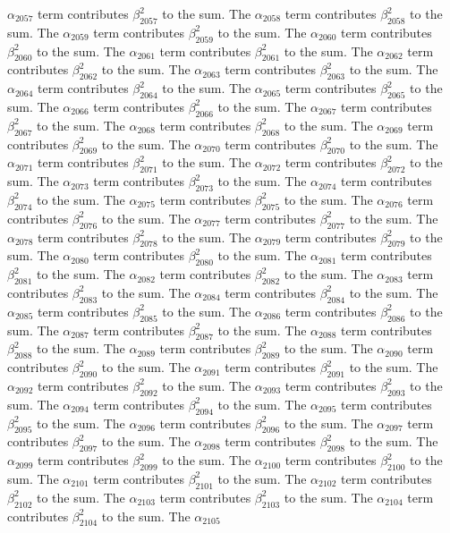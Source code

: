\begin{lemma}
$\alpha_{2057}$ term contributes $\beta_{2057}^{2}$ to the sum. The $\alpha_{2058}$ term contributes $\beta_{2058}^{2}$ to the sum. The $\alpha_{2059}$ term contributes $\beta_{2059}^{2}$ to the sum. The $\alpha_{2060}$ term contributes $\beta_{2060}^{2}$ to the sum. The $\alpha_{2061}$ term contributes $\beta_{2061}^{2}$ to the sum. The $\alpha_{2062}$ term contributes $\beta_{2062}^{2}$ to the sum. The $\alpha_{2063}$ term contributes $\beta_{2063}^{2}$ to the sum. The $\alpha_{2064}$ term contributes $\beta_{2064}^{2}$ to the sum. The $\alpha_{2065}$ term contributes $\beta_{2065}^{2}$ to the sum. The $\alpha_{2066}$ term contributes $\beta_{2066}^{2}$ to the sum. The $\alpha_{2067}$ term contributes $\beta_{2067}^{2}$ to the sum. The $\alpha_{2068}$ term contributes $\beta_{2068}^{2}$ to the sum. The $\alpha_{2069}$ term contributes $\beta_{2069}^{2}$ to the sum. The $\alpha_{2070}$ term contributes $\beta_{2070}^{2}$ to the sum. The $\alpha_{2071}$ term contributes $\beta_{2071}^{2}$ to the sum. The $\alpha_{2072}$ term contributes $\beta_{2072}^{2}$ to the sum. The $\alpha_{2073}$ term contributes $\beta_{2073}^{2}$ to the sum. The $\alpha_{2074}$ term contributes $\beta_{2074}^{2}$ to the sum. The $\alpha_{2075}$ term contributes $\beta_{2075}^{2}$ to the sum. The $\alpha_{2076}$ term contributes $\beta_{2076}^{2}$ to the sum. The $\alpha_{2077}$ term contributes $\beta_{2077}^{2}$ to the sum. The $\alpha_{2078}$ term contributes $\beta_{2078}^{2}$ to the sum. The $\alpha_{2079}$ term contributes $\beta_{2079}^{2}$ to the sum. The $\alpha_{2080}$ term contributes $\beta_{2080}^{2}$ to the sum. The $\alpha_{2081}$ term contributes $\beta_{2081}^{2}$ to the sum. The $\alpha_{2082}$ term contributes $\beta_{2082}^{2}$ to the sum. The $\alpha_{2083}$ term contributes $\beta_{2083}^{2}$ to the sum. The $\alpha_{2084}$ term contributes $\beta_{2084}^{2}$ to the sum. The $\alpha_{2085}$ term contributes $\beta_{2085}^{2}$ to the sum. The $\alpha_{2086}$ term contributes $\beta_{2086}^{2}$ to the sum. The $\alpha_{2087}$ term contributes $\beta_{2087}^{2}$ to the sum. The $\alpha_{2088}$ term contributes $\beta_{2088}^{2}$ to the sum. The $\alpha_{2089}$ term contributes $\beta_{2089}^{2}$ to the sum. The $\alpha_{2090}$ term contributes $\beta_{2090}^{2}$ to the sum. The $\alpha_{2091}$ term contributes $\beta_{2091}^{2}$ to the sum. The $\alpha_{2092}$ term contributes $\beta_{2092}^{2}$ to the sum. The $\alpha_{2093}$ term contributes $\beta_{2093}^{2}$ to the sum. The $\alpha_{2094}$ term contributes $\beta_{2094}^{2}$ to the sum. The $\alpha_{2095}$ term contributes $\beta_{2095}^{2}$ to the sum. The $\alpha_{2096}$ term contributes $\beta_{2096}^{2}$ to the sum. The $\alpha_{2097}$ term contributes $\beta_{2097}^{2}$ to the sum. The $\alpha_{2098}$ term contributes $\beta_{2098}^{2}$ to the sum. The $\alpha_{2099}$ term contributes $\beta_{2099}^{2}$ to the sum. The $\alpha_{2100}$ term contributes $\beta_{2100}^{2}$ to the sum. The $\alpha_{2101}$ term contributes $\beta_{2101}^{2}$ to the sum. The $\alpha_{2102}$ term contributes $\beta_{2102}^{2}$ to the sum. The $\alpha_{2103}$ term contributes $\beta_{2103}^{2}$ to the sum. The $\alpha_{2104}$ term contributes $\beta_{2104}^{2}$ to the sum. The $\alpha_{2105}$ 
\end{lemma}
